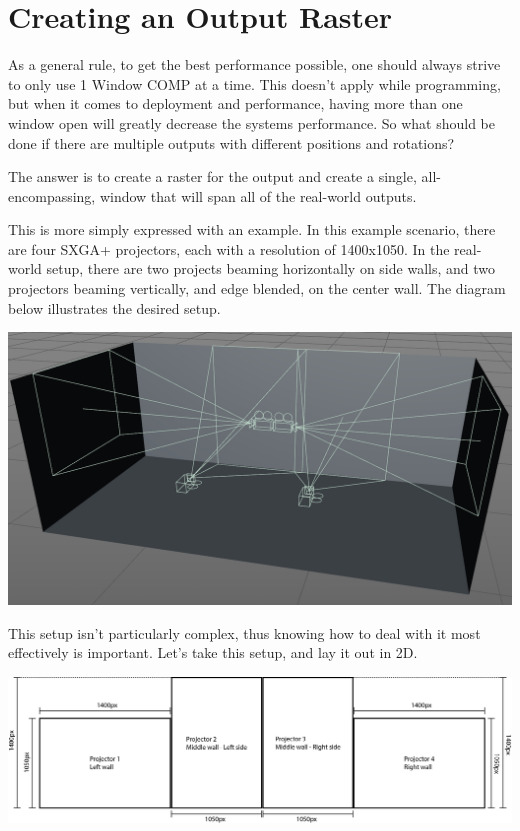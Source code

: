 
\section{Creating an Output Raster}

\begin{fullwidth}

As a general rule, to get the best performance possible, one should always strive to only use 1 Window COMP at a time. This doesn't apply while programming, but when it comes to deployment and performance, having more than one window open will greatly decrease the systems performance. So what should be done if there are multiple outputs with different positions and rotations?

The answer is to create a raster for the output and create a single, all-encompassing, window that will span all of the real-world outputs.

This is more simply expressed with an example. In this example scenario, there are four SXGA+ projectors, each with a resolution of 1400x1050. In the real-world setup, there are two projects beaming horizontally on side walls, and two projectors beaming vertically, and edge blended, on the center wall. The diagram below illustrates the desired setup.

\begin{center}
\includegraphics{./img/10.3/raster-1.png}
\end{center}

This setup isn't particularly complex, thus knowing how to deal with it most effectively is important. Let's take this setup, and lay it out in 2D. 

\begin{center}
\includegraphics{./img/10.3/raster-2.png}
\end{center}


\end{fullwidth}
